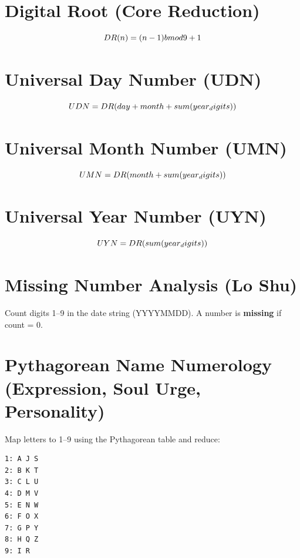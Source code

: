 \documentclass[
  11pt,
  a4paper,
  oneside,
  openany]{report}
\begin{document}
\section{Digital Root (Core
Reduction)}\label{digital-root-core-reduction}

\[
DR(n) = (n - 1) \\bmod 9 + 1
\]

\section{Universal Day Number (UDN)}\label{universal-day-number-udn}

\[
UDN = DR(day + month + sum(year\\_digits))
\]

\section{Universal Month Number (UMN)}\label{universal-month-number-umn}

\[
UMN = DR(month + sum(year\\_digits))
\]

\section{Universal Year Number (UYN)}\label{universal-year-number-uyn}

\[
UYN = DR(sum(year\\_digits))
\]

\section{Missing Number Analysis (Lo
Shu)}\label{missing-number-analysis-lo-shu}

Count digits 1--9 in the date string (YYYYMMDD). A number is
\textbf{missing} if count = 0.

\section{Pythagorean Name Numerology (Expression, Soul Urge,
Personality)}\label{pythagorean-name-numerology-expression-soul-urge-personality}

Map letters to 1--9 using the Pythagorean table and reduce:

\begin{verbatim}
1: A J S
2: B K T
3: C L U
4: D M V
5: E N W
6: F O X
7: G P Y
8: H Q Z
9: I R
\end{verbatim}
\end{document}
